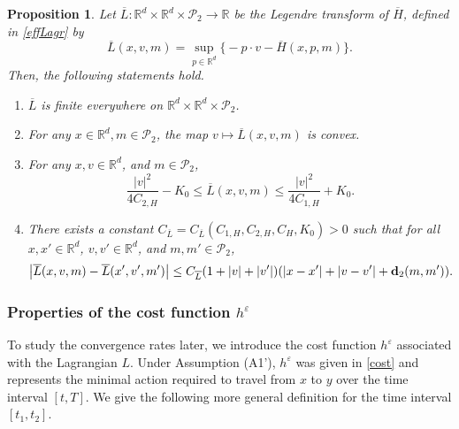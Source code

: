 \documentclass[reqno,11pt]{amsart}
\newtheorem{proposition}[theorem]{Proposition}
\numberwithin{equation}{section}
\newcommand{\R}{\mathbb{R}} %
\newcommand{\e}{\varepsilon}
\renewcommand{\bar}{\overline}
\begin{document}
\begin{proposition}\label{prop:Lbarmprop}
 Let $\bar{L}: \mathbb{R}^d \times \mathbb{R}^d \times \mathcal{P}_2\rightarrow \mathbb{R}$ be the Legendre transform of $\bar{H}$, defined in \eqref{effLagr} by
\[
\bar{L}(x,v,m) = \sup_{p \in \R^d} \big\{ -p \cdot v - \bar{H}(x,p,m) \big\}.
\]
Then, the following statements hold.
\begin{enumerate}
    \item[$\rm{(1)}$] \(\bar{L}\) is finite everywhere on \(\mathbb{R}^d \times\mathbb{R}^d \times \mathcal{P}_2 \).
    \item[$\rm{(2)}$] For any \(x \in \R^d, m \in \mathcal{P}_2\), the map \(v \mapsto \bar{L}(x, v, m)\) is convex.
    \item[$\rm{(3)}$] For any $x, v \in \mathbb{R}^d$, and \(m \in \mathcal{P}_2\),
    \begin{equation}\label{eqn:Lbarmquad}
    \frac{|v|^2}{4C_{2,H}} -K_0 \leq \bar{L}(x, v, m) \leq \frac{|v|^2}{4C_{1,H}} +K_0.       \end{equation}

    \item[$\rm{(4)}$] There exists a constant $C_{\bar{L}}=C_{\bar{L}}(C_{1,H},C_{2,H}, C_H,K_0)>0$ such that for all
    $x, x'\in \R^d$, $v,v'\in \R^d$, and $m,m'\in \mathcal{P}_2$,
    \begin{equation}\label{eqn:LbarmLip}
    \left|\bar{L}(x,v,m)-\bar{L}(x', v',m')\right|\le C_{\bar{L}}(1+|v|+|v'|)(|x-x'|+|v-v'|+{\bf d}_2(m,m')).
    \end{equation}
\end{enumerate}
\end{proposition}
\vspace{1mm}



\subsubsection{Properties of the cost function $h^\e$}
To study the convergence rates later, we introduce the cost function $h^\e$ associated with the Lagrangian $L$. Under Assumption (A1'), $h^\e$ was given in \eqref{cost} and represents the minimal action required to travel from $x$ to $y$ over the time interval $[t,T]$. We give the following more general definition for the time interval $[t_1,t_2]$.
\end{document}
